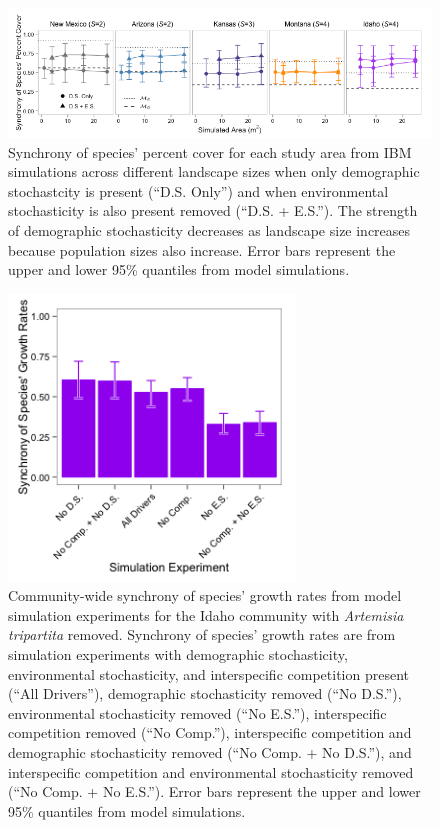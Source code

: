 \documentclass[12pt,]{article}
\begin{document}
\pagebreak{}

\begin{figure}[!ht]
  \centering
      \includegraphics[width=6in]{./components/formatted_figures/formatted_figureS3.png}
  \caption{Synchrony of species' percent cover for each study area from IBM simulations across different landscape sizes when only demographic stochastcity is present (``D.S. Only'') and when environmental stochasticity is also present removed (``D.S. + E.S.''). The strength of demographic stochasticity decreases as landscape size increases because population sizes also increase. Error bars represent the upper and lower 95\% quantiles from model simulations.}
\end{figure}

\pagebreak{}

\begin{figure}[!ht]
  \centering
      \includegraphics[width=3in]{./components/formatted_figures/formatted_figureS4.png}
  \caption{Community-wide synchrony of species' growth rates from model simulation experiments for the Idaho community with \textit{Artemisia tripartita} removed. Synchrony of species' growth rates are from simulation experiments with demographic stochasticity, environmental stochasticity, and interspecific competition present (``All Drivers''), demographic stochasticity removed (``No D.S.''), environmental stochasticity removed (``No E.S.''), interspecific competition removed (``No Comp.''), interspecific competition and demographic stochasticity removed (``No Comp. + No D.S.''), and interspecific competition and environmental stochasticity removed (``No Comp. + No E.S.''). Error bars represent the upper and lower 95\% quantiles from model simulations.}
\end{figure}
\end{document}
